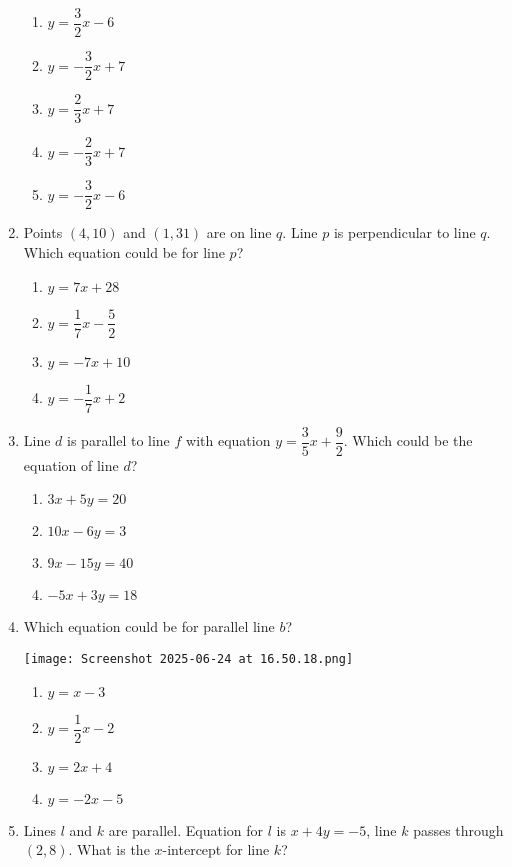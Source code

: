 \documentclass[12pt]{exam}
\begin{document}
\begin{enumerate}
    \begin{enumerate}[label=\Alph*)]
        \item $y = \dfrac{3}{2}x - 6$
        \item $y = -\dfrac{3}{2}x + 7$
        \item $y = \dfrac{2}{3}x + 7$
        \item $y = -\dfrac{2}{3}x + 7$
        \item $y = -\dfrac{3}{2}x - 6$
    \end{enumerate}
    \item Points $(4,10)$ and $(1,31)$ are on line $q$. Line $p$ is perpendicular to line $q$. Which equation could be for line $p$?
    \begin{enumerate}[label=\Alph*)]
        \item $y = 7x + 28$
        \item $y = \dfrac{1}{7}x - \dfrac{5}{2}$
        \item $y = -7x + 10$
        \item $y = -\dfrac{1}{7}x + 2$
    \end{enumerate}
    \item Line $d$ is parallel to line $f$ with equation $y = \dfrac{3}{5}x + \dfrac{9}{2}$. Which could be the equation of line $d$?
    \begin{enumerate}[label=\Alph*)]
        \item $3x + 5y = 20$
        \item $10x - 6y = 3$
        \item $9x - 15y = 40$
        \item $-5x + 3y = 18$
    \end{enumerate}
    \item Which equation could be for parallel line $b$?
    \begin{center}
        \texttt{[image: Screenshot 2025-06-24 at 16.50.18.png]}
    \end{center}
    \begin{enumerate}[label=\Alph*)]
        \item $y = x - 3$
        \item $y = \dfrac{1}{2}x - 2$
        \item $y = 2x + 4$
        \item $y = -2x - 5$
    \end{enumerate}
    \item Lines $l$ and $k$ are parallel. Equation for $l$ is $x + 4y = -5$, line $k$ passes through $(2,8)$. What is the $x$-intercept for line $k$?

\end{enumerate}
\end{document}
